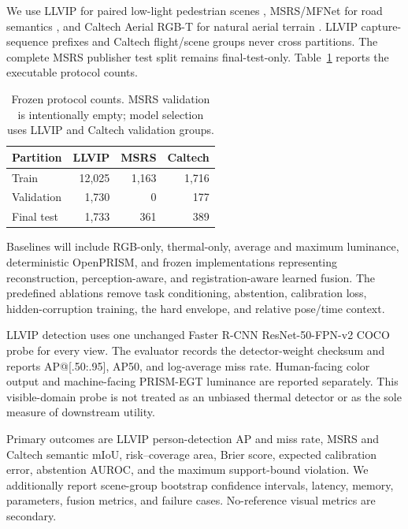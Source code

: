 \documentclass[10pt]{article}
\begin{document}
We use LLVIP for paired low-light pedestrian scenes
\citep{jia2021llvip}, MSRS/MFNet for road semantics
\citep{ha2017mfnet,tang2022seafusion}, and Caltech Aerial RGB-T for natural
aerial terrain \citep{lee2024caltech}. LLVIP capture-sequence prefixes and
Caltech flight/scene groups never cross partitions. The complete MSRS publisher
test split remains final-test-only. Table~\ref{tab:counts} reports the executable
protocol counts.

\begin{table}[H]
\caption{Frozen protocol counts. MSRS validation is intentionally empty; model
selection uses LLVIP and Caltech validation groups.}
\label{tab:counts}
\begin{center}
\begin{tabular}{lrrr}
\toprule
Partition & LLVIP & MSRS & Caltech \\
\midrule
Train & 12,025 & 1,163 & 1,716 \\
Validation & 1,730 & 0 & 177 \\
Final test & 1,733 & 361 & 389 \\
\bottomrule
\end{tabular}
\end{center}
\end{table}

Baselines will include RGB-only, thermal-only, average and maximum luminance,
deterministic OpenPRISM, and frozen implementations representing
reconstruction, perception-aware, and registration-aware learned fusion. The
predefined ablations remove task conditioning, abstention, calibration loss,
hidden-corruption training, the hard envelope, and relative pose/time context.

LLVIP detection uses one unchanged Faster R-CNN ResNet-50-FPN-v2 COCO probe
for every view. The evaluator records the detector-weight checksum and reports
AP@[.50:.95], AP50, and log-average miss rate. Human-facing color output and
machine-facing PRISM-EGT luminance are reported separately. This visible-domain
probe is not treated as an unbiased thermal detector or as the sole measure of
downstream utility.

Primary outcomes are LLVIP person-detection AP and miss rate, MSRS and Caltech
semantic mIoU, risk--coverage area, Brier score, expected calibration error,
abstention AUROC, and the maximum support-bound violation. We additionally
report scene-group bootstrap confidence intervals, latency, memory, parameters,
fusion metrics, and failure cases. No-reference visual metrics are secondary.
\end{document}
